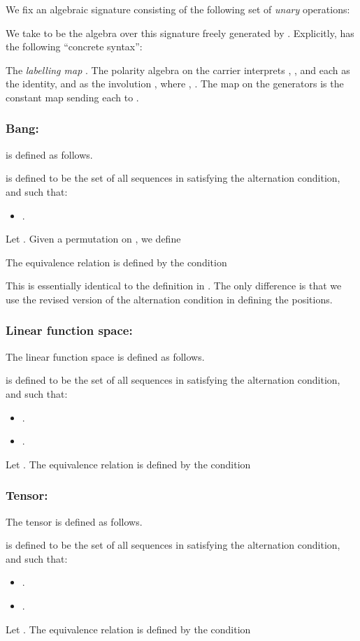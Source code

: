 \documentclass[a4paper,11pt]{article}
\begin{document}
We fix an algebraic signature consisting of the following set of
\emph{unary} operations:

We take  to be the algebra over this signature freely
generated by . Explicitly,  has the following
``concrete syntax'':

The \emph{labelling map} . The polarity algebra on the carrier 
interprets , ,  and each
 as the identity, and  as the involution
, where , . The map on the
generators is the constant map sending each  to .

\subsubsection*{Bang:  }
 is defined as follows.



\noindent  is defined to be the set of all sequences in
 satisfying the alternation condition, and such
that:
\begin{itemize}
\item .
\end{itemize}
Let . Given a
permutation  on , we define

The equivalence relation  is
defined by the condition

This is essentially identical to the definition in \cite{AJM00}.
The only difference is that we use the revised version of the
alternation condition in defining the positions.

\subsubsection*{Linear function space: }
The linear function space  is defined as follows.



\noindent  is defined to be the set of all
sequences in  satisfying the alternation
condition, and such that:
\begin{itemize}
\item .
\item .
\end{itemize}
Let . The equivalence relation  is defined
by the condition

\subsubsection*{Tensor: }
The tensor  is defined as follows.


 \noindent  is defined to be the
set of all sequences in  satisfying the
alternation condition, and such that:
\begin{itemize}
\item .
\item .
\end{itemize}
Let . The equivalence relation  is defined by
the condition
\end{document}
